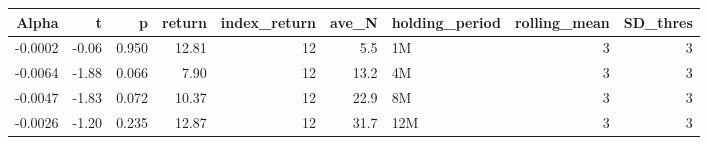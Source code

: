 \begin{table}[ht]
\centering
\begin{tabular}{rrrrrrlrr}
  \hline
Alpha & t & p & return & index\_return & ave\_N & holding\_period & rolling\_mean & SD\_thres \\ 
  \hline
-0.0002 & -0.06 & 0.950 & 12.81 & 12 & 5.5 & 1M &  3 &  3 \\ 
  -0.0064 & -1.88 & 0.066 & 7.90 & 12 & 13.2 & 4M &  3 &  3 \\ 
  -0.0047 & -1.83 & 0.072 & 10.37 & 12 & 22.9 & 8M &  3 &  3 \\ 
  -0.0026 & -1.20 & 0.235 & 12.87 & 12 & 31.7 & 12M &  3 &  3 \\ 
   \hline
\end{tabular}
\end{table}


